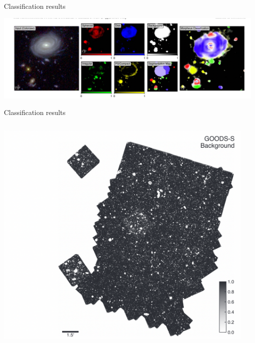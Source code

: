 \documentclass[aspectratio=1610,xcolor={dvipsnames},hyperref={colorlinks,unicode,linkcolor=violet,anchorcolor=blueviolet,citecolor=YellowOrange,filecolor=black,urlcolor=Aquamarine}]{beamer}
\begin{document}
\begin{frame}[label={sec:org388f650}]{Classification results}
\begin{center}
\includegraphics[width=.9\linewidth]{./p11.png}
\end{center}
\end{frame}

\begin{frame}[label={sec:orge5644a2}]{Classification results}
\begin{columns}
\begin{column}{0.5\textwidth}

\begin{center}
\includegraphics[width=.9\linewidth]{./p12.png}
\end{center}

\end{column}
\begin{column}{0.5\textwidth}


\end{column}
\end{columns}
\end{frame}
\end{document}
